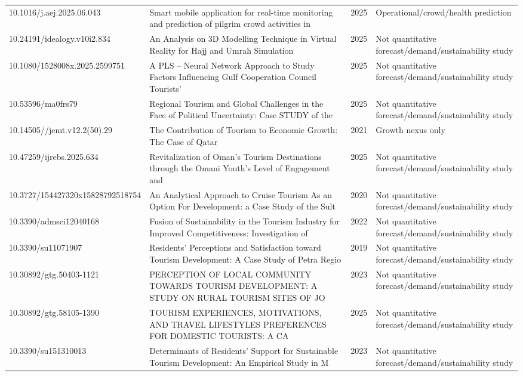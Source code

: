 \begin{longtable}{@{}p{3.6cm}p{7.3cm}p{0.8cm}p{3.4cm}@{}}
10.1016/j.aej.2025.06.043 & Smart mobile application for real-time monitoring and prediction of pilgrim crowd activities in & 2025 & Operational/crowd/health prediction \\
10.24191/idealogy.v10i2.834 & An Analysis on 3D Modelling Technique in Virtual Reality for Hajj and Umrah Simulation & 2025 & Not quantitative forecast/demand/sustainability study \\
10.1080/1528008x.2025.2599751 & A PLS – Neural Network Approach to Study Factors Influencing Gulf Cooperation Council Tourists’ & 2025 & Not quantitative forecast/demand/sustainability study \\
10.53596/ma0frs79 & Regional Tourism and Global Challenges in the Face of Political Uncertainty: Case STUDY of the  & 2025 & Not quantitative forecast/demand/sustainability study \\
10.14505//jemt.v12.2(50).29 & The Contribution of Tourism to Economic Growth: The Case of Qatar & 2021 & Growth nexus only \\
10.47259/ijrebs.2025.634 & Revitalization of Oman’s Tourism Destinations through the Omani Youth’s Level of Engagement and & 2025 & Not quantitative forecast/demand/sustainability study \\
10.3727/154427320x15828792518754 & An Analytical Approach to Cruise Tourism As an Option For Development: a Case Study of the Sult & 2020 & Not quantitative forecast/demand/sustainability study \\
10.3390/admsci12040168 & Fusion of Sustainability in the Tourism Industry for Improved Competitiveness: Investigation of & 2022 & Not quantitative forecast/demand/sustainability study \\
10.3390/su11071907 & Residents’ Perceptions and Satisfaction toward Tourism Development: A Case Study of Petra Regio & 2019 & Not quantitative forecast/demand/sustainability study \\
10.30892/gtg.50403-1121 & PERCEPTION OF LOCAL COMMUNITY TOWARDS TOURISM DEVELOPMENT: A STUDY ON RURAL TOURISM SITES OF JO & 2023 & Not quantitative forecast/demand/sustainability study \\
10.30892/gtg.58105-1390 & TOURISM EXPERIENCES, MOTIVATIONS, AND TRAVEL LIFESTYLES PREFERENCES FOR DOMESTIC TOURISTS: A CA & 2025 & Not quantitative forecast/demand/sustainability study \\
10.3390/su151310013 & Determinants of Residents’ Support for Sustainable Tourism Development: An Empirical Study in M & 2023 & Not quantitative forecast/demand/sustainability study \\

\end{longtable}
